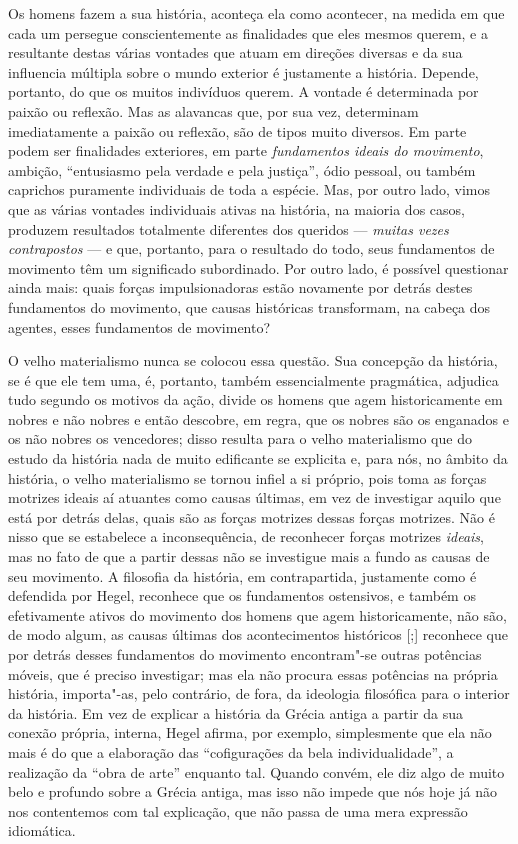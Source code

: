 Os homens fazem a sua história, aconteça ela como acontecer, na medida
em que cada um persegue conscientemente as finalidades que eles mesmos %
querem, e a resultante destas várias vontades que atuam em direções
diversas e da sua influencia múltipla sobre o mundo exterior é
justamente a história. Depende, portanto, do que os muitos indivíduos
querem. A vontade é determinada por paixão ou reflexão. Mas as alavancas
que, por sua vez, determinam imediatamente a paixão ou reflexão, são de
tipos muito diversos. Em parte podem ser finalidades exteriores, em
parte \emph{fundamentos ideais do movimento}, 
ambição, ``entusiasmo pela verdade e pela justiça'', ódio
pessoal, ou também caprichos puramente individuais de toda a espécie.
Mas, por outro lado, vimos que as várias vontades individuais ativas na
história, na maioria dos casos, produzem resultados totalmente
diferentes dos queridos --- \emph{muitas vezes contrapostos} --- e que,
portanto, para o resultado do todo, seus fundamentos de movimento têm um
significado subordinado. Por outro lado, é possível questionar ainda
mais: quais forças impulsionadoras estão novamente por detrás destes
fundamentos do movimento, que causas históricas transformam, na cabeça
dos agentes, esses fundamentos de movimento?

O velho materialismo nunca se colocou essa questão. Sua concepção da
história, se é que ele tem uma, é, portanto, também essencialmente
pragmática, adjudica tudo segundo os motivos da ação, divide os homens
que agem historicamente em nobres e não nobres e então descobre, em
regra, que os nobres são os enganados e os não
nobres os vencedores; disso resulta para o velho materialismo que do
estudo da história nada de muito edificante se explicita e, para nós, no
âmbito da história, o velho materialismo se tornou infiel a si próprio,
pois toma as forças motrizes ideais aí atuantes como causas últimas, em
vez de investigar aquilo que está por detrás delas, quais são as forças
motrizes dessas forças motrizes. Não é nisso que se estabelece a
inconsequência, de reconhecer forças motrizes \emph{ideais}, mas no fato
de que a partir dessas não se investigue mais a fundo as causas de seu
movimento. A filosofia da história, em contrapartida, justamente como é
defendida
por Hegel,
reconhece que os fundamentos ostensivos, e também os efetivamente ativos
do movimento dos homens que agem historicamente, não são, de modo algum,
as causas últimas dos acontecimentos históricos {[};{]} reconhece que
por detrás desses fundamentos do movimento encontram"-se outras potências
móveis, que é preciso investigar; mas ela não procura 
essas potências na própria história, importa"-as, pelo contrário, de %
fora, da ideologia filosófica para o interior da história. Em vez de
explicar a história da Grécia antiga a partir da sua conexão própria,
interna, Hegel afirma,
por exemplo, simplesmente que ela não mais é do que a elaboração das
``cofigurações da bela individualidade'', a realização da ``obra de
arte'' enquanto tal. Quando convém, ele diz algo de muito belo e
profundo sobre a Grécia antiga, mas isso não impede que nós hoje já não
nos contentemos com tal explicação, que não passa de uma mera expressão
idiomática.


